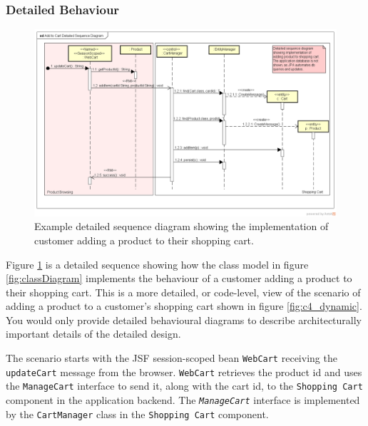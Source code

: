 \subsubsection{Detailed Behaviour}\label{sec:detailedSeqDiagram}
\begin{figure}[h!]
    \centering
    \begin{adjustwidth}{-11mm}{-11mm}
        \includegraphics[trim=35 69 24 47,clip,width=0.98\paperwidth]{images/uml/detailed_sequence_diagram.png}
    \end{adjustwidth}
    \caption{Example detailed sequence diagram showing the implementation of customer adding a product to their shopping cart.}
    \label{fig:detailedSequenceDiagram}
\end{figure}

\noindent
Figure \ref{fig:detailedSequenceDiagram} is a detailed sequence showing how the class model in
figure \ref{fig:classDiagram} implements the behaviour of a customer adding a product to their shopping cart.
This is a more detailed, or code-level, view of the scenario of adding a product to a customer's shopping cart shown in figure \ref{fig:c4_dynamic}.
You would only provide detailed behavioural diagrams to describe architecturally important details of the detailed design.

The scenario starts with the JSF session-scoped bean \texttt{WebCart} receiving the \texttt{updateCart} message from the browser.
\texttt{WebCart} retrieves the product id and uses the \texttt{ManageCart} interface to send it, along with the cart id,
to the \texttt{Shopping Cart} component in the application backend.
The \texttt{\textsl{ManageCart}} interface is implemented by the \texttt{CartManager} class in the \texttt{Shopping Cart} component.

